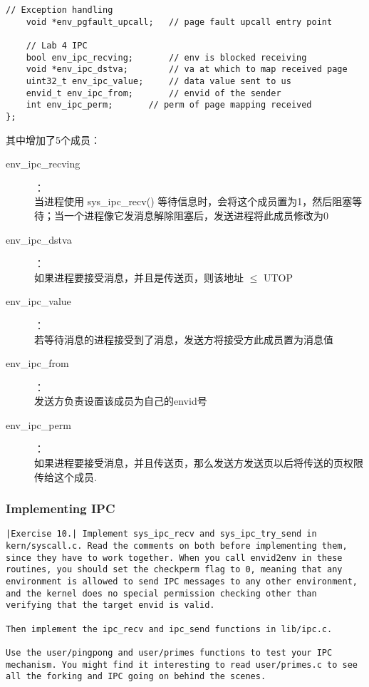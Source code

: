 \documentclass{article}
\newcommand{\funcname}[1]{{\ttfamily \small #1}}
\begin{document}
\begin{CJK*}{UTF8}{gkai}
\begin{lstlisting}[style=ccode, firstnumber=38, title={\scriptsize \ttfamily \bfseries inc/env.h}]
	// Exception handling
	void *env_pgfault_upcall;	// page fault upcall entry point

	// Lab 4 IPC
	bool env_ipc_recving;		// env is blocked receiving
	void *env_ipc_dstva;		// va at which to map received page
	uint32_t env_ipc_value;		// data value sent to us 
	envid_t env_ipc_from;		// envid of the sender	
	int env_ipc_perm;		// perm of page mapping received
};

\end{lstlisting}

其中增加了5个成员：

\begin{description}
\item[env\_ipc\_recving] ：\\
当进程使用 \funcname{sys\_ipc\_recv()} 等待信息时，会将这个成员置为1，然后阻塞等待；当一个进程像它发消息解除阻塞后，发送进程将此成员修改为0
\item[env\_ipc\_dstva] ：\\
如果进程要接受消息，并且是传送页，则该地址 $\leq$ UTOP
\item[env\_ipc\_value] ：\\
若等待消息的进程接受到了消息，发送方将接受方此成员置为消息值
\item[env\_ipc\_from] ：\\
发送方负责设置该成员为自己的envid号
\item[env\_ipc\_perm] ：\\
如果进程要接受消息，并且传送页，那么发送方发送页以后将传送的页权限传给这个成员.
\end{description}

\subsubsection{Implementing IPC}


\begin{lstlisting}[style=exercise]
|Exercise 10.| Implement sys_ipc_recv and sys_ipc_try_send in kern/syscall.c. Read the comments on both before implementing them, since they have to work together. When you call envid2env in these routines, you should set the checkperm flag to 0, meaning that any environment is allowed to send IPC messages to any other environment, and the kernel does no special permission checking other than verifying that the target envid is valid.

Then implement the ipc_recv and ipc_send functions in lib/ipc.c.

Use the user/pingpong and user/primes functions to test your IPC mechanism. You might find it interesting to read user/primes.c to see all the forking and IPC going on behind the scenes.
\end{lstlisting}


\end{CJK*}
\end{document}
